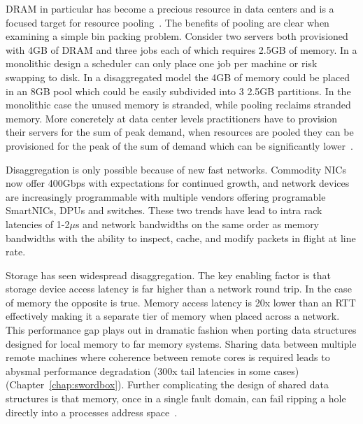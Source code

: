 \documentclass[12pt]{ucsddissertation}
\begin{document}
\begin{dissertationintroduction}
DRAM in particular has become a precious resource in data centers and is a focused target for
resource pooling~\cite{micron-memorywall}. The benefits of pooling are clear when examining a simple
bin packing problem. Consider two servers both provisioned with 4GB of DRAM and three jobs each of
which requires 2.5GB of memory. In a monolithic design a scheduler can only place one job per
machine or risk swapping to disk. In a disaggregated model the 4GB of memory could be placed in an
8GB pool which could be easily subdivided into 3 2.5GB partitions. In the monolithic case the unused
memory is stranded, while pooling reclaims stranded memory.  More concretely at data center levels
practitioners have to provision their servers for the sum of peak demand, when resources are pooled
they can be provisioned for the peak of the sum of demand which can be significantly
lower~\cite{supernic, dsnf}.

Disaggregation is only possible because of new fast networks. Commodity NICs now offer 400Gbps with
expectations for continued growth, and network devices are increasingly programmable with multiple
vendors offering programable SmartNICs, DPUs and switches.  These two trends have lead to intra rack
latencies of 1-2{$\mu$}s and network bandwidths on the same order as memory bandwidths with the
ability to inspect, cache, and modify packets in flight at line rate.

Storage has seen widespread disaggregation. The key enabling factor is that storage device access
latency is far higher than a network round trip. In the case of memory the opposite is true. Memory
access latency is 20x lower than an RTT effectively making it a separate tier of memory when placed
across a network.  This performance gap plays out in dramatic fashion when porting data structures
designed for local memory to far memory systems. Sharing data between multiple remote machines where
coherence between remote cores is required leads to abysmal performance degradation (300x tail
latencies in some cases)(Chapter~\ref{chap:swordbox}). Further complicating the design of shared
data structures is that memory, once in a single fault domain, can fail ripping a hole directly into
a processes address space~\cite{amanda-hotnets,hydra,legoos}.


\end{dissertationintroduction}
\end{document}
